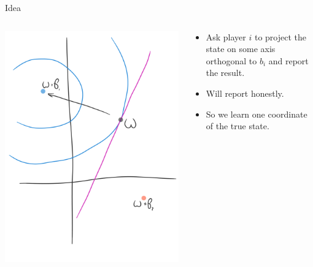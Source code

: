 \documentclass[english,10pt
,aspectratio=169
]{beamer}
\begin{document}
\begin{frame}{Idea}
\begin{columns}
	\begin{column}{0.5\textwidth}
		\begin{center}
			\includegraphics[scale=0.18]{pics/M4/battaglini02.png}
		\end{center}
	\end{column}
	\begin{column}{0.5\textwidth}
		{\small
			\begin{itemize}
				\item Ask player $i$ to project the state on some axis orthogonal to $b_i$ and report the result.
				\item Will report honestly.
				\item So we learn one coordinate of the true state.
			\end{itemize}
		}
	\end{column}
\end{columns}
\end{frame}
\end{document}

